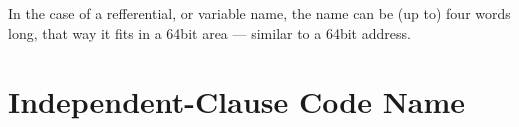 
In the case of a refferential, or variable name, the name can be (up to) four
words long, that way it fits in a 64bit area --- similar to a 64bit address.

\section{Independent-Clause Code Name}


